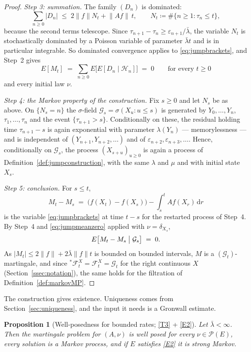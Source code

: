 \documentclass[11pt,a4paper]{article}
\theoremstyle{plain}
\newtheorem{proposition}[theorem]{Proposition}
\theoremstyle{definition}
\theoremstyle{remark}
\newcommand{\Prob}{\mathcal{P}}                %
\newcommand{\Filt}{\mathcal{F}}
\newcommand{\Gilt}{\mathcal{G}}
\newcommand{\dif}{\,\mathrm{d}}
\begin{document}
\begin{proof}
  \emph{Step 3: summation.}  The family $(D_n)$ is dominated:
  \[
    \sum_{n \geq 0} |D_n|
      \;\leq\; 2\lVert f\rVert N_t + \lVert Af\rVert \, t ,
    \qquad N_t \coloneqq \#\{n \geq 1 : \tau_n \leq t\} ,
  \]
  because the second terms telescope.  Since $\tau_{n+1}-\tau_n \geq
  \varepsilon_{n+1}/\bar\lambda$, the variable $N_t$ is stochastically dominated
  by a Poisson variable of parameter $\bar\lambda t$ and is in particular
  integrable.  So dominated convergence applies to \eqref{eq:jumpbrackets}, and
  Step~2 gives
  \begin{equation}
    \label{eq:jumpmeanzero}
    E[M_t] \;=\; \sum_{n \geq 0} E\bigl[ E[D_n \mid \mathcal{H}_n] \bigr] \;=\; 0
    \qquad \text{for every } t \geq 0
  \end{equation}
  and every initial law $\nu$.

  \emph{Step 4: the Markov property of the construction.}  Fix $s \geq 0$ and let
  $N_s$ be as above.  On $\{N_s = n\}$ the $\sigma$-field
  $\Gilt_s = \sigma(X_u : u \leq s)$ is generated by
  $Y_0,\dots,Y_n$, $\tau_1,\dots,\tau_n$ and the event $\{\tau_{n+1} > s\}$.
  Conditionally on these, the residual holding time $\tau_{n+1} - s$ is again
  exponential with parameter $\lambda(Y_n)$ --- memorylessness --- and is
  independent of $(Y_{n+1}, Y_{n+2}, \dots)$ and of
  $\varepsilon_{n+2}, \varepsilon_{n+3}, \dots$.  Hence, conditionally on
  $\Gilt_s$, the process $(X_{s+u})_{u \geq 0}$ is again a process of
  Definition~\ref{def:jumpconstruction}, with the same $\lambda$ and $\mu$ and
  with initial state $X_s$.

  \emph{Step 5: conclusion.}  For $s \leq t$,
  \[
    M_t - M_s \;=\; \bigl( f(X_t) - f(X_s) \bigr) - \int_s^t Af(X_r) \dif r
  \]
  is the variable \eqref{eq:jumpbrackets} at time $t-s$ for the restarted process
  of Step~4.  By Step~4 and \eqref{eq:jumpmeanzero} applied with $\nu = \delta_{X_s}$,
  \[
    E\bigl[ M_t - M_s \bigm| \Gilt_s \bigr] \;=\; 0 .
  \]
  As $|M_t| \leq 2\lVert f\rVert + 2\bar{\lambda}\lVert f\rVert t$ is bounded on
  bounded intervals, $M$ is a $(\Gilt_t)$-martingale, and since
  ${}^{*}\Filt^X_t = \Filt^X_t = \Gilt_t$ for the right continuous $X$
  (Section~\ref{ssec:notation}), the same holds for the filtration of
  Definition~\ref{def:markovMP}.
\end{proof}

The construction gives existence.  Uniqueness comes from
Section~\ref{sec:uniqueness}, and the input it needs is a Gronwall estimate.

\begin{proposition}[Well-posedness for bounded rates; \eqref{T3} + \eqref{E2}]
  \label{prop:jumpwellposed}
  Let $\bar{\lambda} < \infty$.  Then the martingale problem for $(A,\nu)$ is well
  posed for every $\nu \in \Prob(E)$, every solution is a Markov process, and if
  $E$ satisfies \eqref{E2} it is strong Markov.
\end{proposition}
\end{document}
